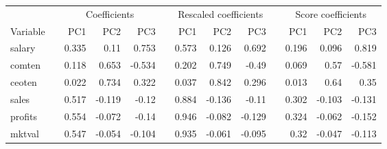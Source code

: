 \begin{tabular}{lrrrrrrrrrrrr}
\toprule
 &  & \multicolumn{3}{c}{Coefficients} &  & \multicolumn{3}{c}{Rescaled coefficients} &  & \multicolumn{3}{c}{Score coefficients} \\ 
\cmidrule(lr){3-5} \cmidrule(lr){7-9} \cmidrule(lr){11-13}
Variable &  & PC1 & PC2 & PC3 &  & PC1 & PC2 & PC3 &  & PC1 & PC2 & PC3 \\ 
\midrule\addlinespace[2.5pt]
salary &  & 0.335 & 0.11 & 0.753 &  & 0.573 & 0.126 & 0.692 &  & 0.196 & 0.096 & 0.819 \\ 
comten &  & 0.118 & 0.653 & -0.534 &  & 0.202 & 0.749 & -0.49 &  & 0.069 & 0.57 & -0.581 \\ 
ceoten &  & 0.022 & 0.734 & 0.322 &  & 0.037 & 0.842 & 0.296 &  & 0.013 & 0.64 & 0.35 \\ 
sales &  & 0.517 & -0.119 & -0.12 &  & 0.884 & -0.136 & -0.11 &  & 0.302 & -0.103 & -0.131 \\ 
profits &  & 0.554 & -0.072 & -0.14 &  & 0.946 & -0.082 & -0.129 &  & 0.324 & -0.062 & -0.152 \\ 
mktval &  & 0.547 & -0.054 & -0.104 &  & 0.935 & -0.061 & -0.095 &  & 0.32 & -0.047 & -0.113 \\ 
\bottomrule
\end{tabular}

